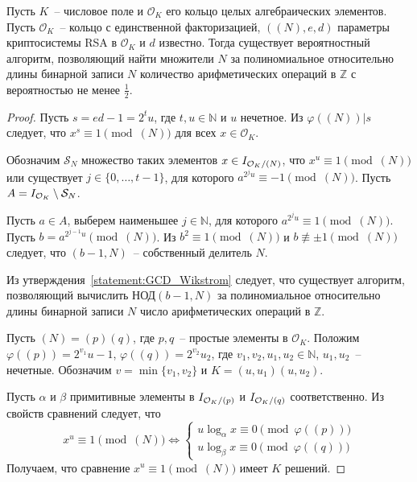 \documentclass[_00_dissertation.tex]{subfiles}
\begin{document}
\begin{theorem}\label{theorem:factor}
    Пусть $K$~-- числовое поле и $\mathcal{O}_K$ его кольцо целых алгебраических элементов.
    Пусть $\mathcal{O}_K$~-- кольцо с единственной факторизацией, $((N), e, d)$ параметры криптосистемы RSA в $\mathcal{O}_K$ и $d$ известно.
    Тогда существует вероятностный алгоритм, позволяющий найти множители $N$ за полиномиальное относительно длины бинарной записи $N$ количество арифметических операций в $\mathbb{Z}$ с вероятностью не менее $\frac{1}{2}$.
\end{theorem}
\begin{proof}
    Пусть $s = ed - 1 = 2^t u$, где $t, u \in \mathbb{N}$ и $u$ нечетное.
    Из $\varphi((N)) | s$ следует, что $x^s \equiv 1 \pmod{(N)}$ для всех $x \in \mathcal{O}_K$.
    
    Обозначим $\mathcal{S}_N$ множество таких элементов $x \in I_{\mathcal{O}_K / (N)}$, что $x^u \equiv 1 \pmod{(N)}$ или существует $j \in \{0, \dots, t-1\}$, для которого $a^{2^j u} \equiv -1 \pmod{(N)}$.
    Пусть $A = I_{\mathcal{O}_K} \setminus \mathcal{S}_N$.
    
    Пусть $a \in A$, выберем наименьшее $j \in \mathbb{N}$, для которого $a^{2^j u} \equiv 1 \pmod{(N)}$.
    Пусть $b = a^{2^{j-1} u} \pmod{(N)}$.
    Из $b^2 \equiv 1 \pmod{(N)}$ и $b \not\equiv \pm 1 \pmod{(N)}$ следует, что $(b - 1, N)$~-- собственный делитель $N$.

    Из утверждения~\ref{statement:GCD_Wikstrom} следует, что существует алгоритм, позволяющий вычислить $\textrm{НОД}(b - 1, N)$ за полиномиальное относительно длины бинарной записи $N$ число арифметических операций в $\mathbb{Z}$.
    
    Пусть $(N) = (p)(q)$, где $p, q$~-- простые элементы в $\mathcal{O}_K$.
    Положим $\varphi((p)) = 2^{v_1} u-1$, $\varphi((q)) = 2^{v_2} u_2$, где $v_1, v_2, u_1, u_2 \in \mathbb{N}$, $u_1, u_2$~-- нечетные.
    Обозначим $v = \min\{v_1, v_2\}$ и $K = (u, u_1)(u, u_2)$.

    Пусть $\alpha$ и $\beta$ примитивные элементы в $I_{\mathcal{O}_K / (p)}$ и $I_{\mathcal{O}_K / (q)}$ соответственно.
    Из свойств сравнений следует, что
    \begin{equation*}
        x^u \equiv 1 \pmod{(N)}
        \Leftrightarrow
        \begin{cases}
            u \log_{\alpha} x \equiv 0 \pmod{\varphi((p))}\\
            u \log_{\beta} x \equiv 0 \pmod{\varphi((q))}
        \end{cases}
    \end{equation*}
    Получаем, что сравнение $x^u \equiv 1 \pmod{(N)}$ имеет $K$ решений.
    

\end{proof}
\end{document}
